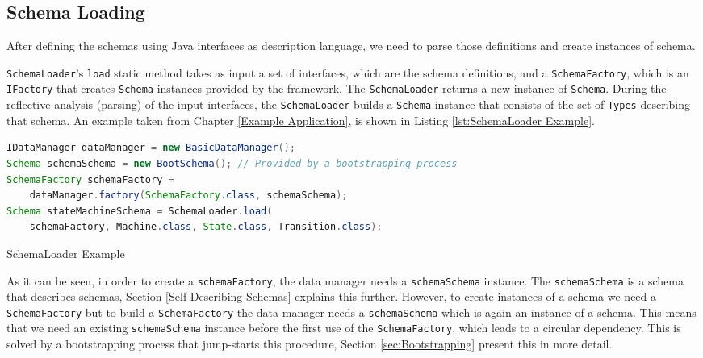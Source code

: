 \subsection{Schema Loading}\label{sec:Schema Loading}
After defining the schemas using Java interfaces as description language, we need to parse those definitions and create instances of schema.

\texttt{SchemaLoader}'s \texttt{load} static method takes as input a set of interfaces, which are the schema definitions, and a \texttt{SchemaFactory}, which is an \texttt{IFactory} that creates \texttt{Schema} instances provided by the framework.
The \texttt{SchemaLoader} returns a new instance of \texttt{Schema}.
During the reflective analysis (parsing) of the input interfaces, the \texttt{SchemaLoader} builds a \texttt{Schema} instance that consists of the set of \texttt{Types} describing that schema.
An example taken from Chapter \ref{Example Application}, is shown in Listing \ref{lst:SchemaLoader Example}.

\begin{sourcecode} [H]
	\begin{lstlisting}[language=Java, escapechar=|]
IDataManager dataManager = new BasicDataManager();
Schema schemaSchema = new BootSchema(); // Provided by a bootstrapping process
SchemaFactory schemaFactory = 
	dataManager.factory(SchemaFactory.class, schemaSchema);
Schema stateMachineSchema = SchemaLoader.load(
	schemaFactory, Machine.class, State.class, Transition.class);
	\end{lstlisting}
	\caption{SchemaLoader Example}
	\label{lst:SchemaLoader Example}
\end{sourcecode}

As it can be seen, in order to create a \texttt{schemaFactory}, the data manager needs a \texttt{schemaSchema} instance.
The \texttt{schemaSchema} is a schema that describes schemas, Section \ref{Self-Describing Schemas} explains this further.
However, to create instances of a schema we need a \texttt{SchemaFactory} but to build a \texttt{SchemaFactory} the data manager needs a \texttt{schemaSchema} which is again an instance of a schema.
This means that we need an existing \texttt{schemaSchema} instance before the first use of the \texttt{SchemaFactory}, which leads to a circular dependency.
This is solved by a bootstrapping process that jump-starts this procedure, Section \ref{sec:Bootstrapping} present this in more detail.

